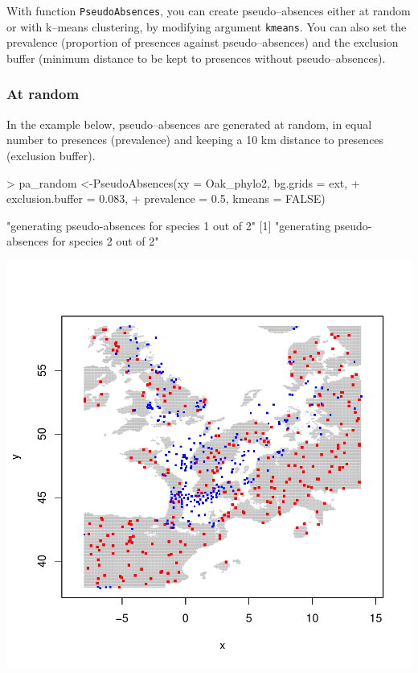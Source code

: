 \documentclass[10pt,a4paper]{article}
\begin{document}
With function \texttt{PseudoAbsences}, you can create pseudo--absences either at random or with k--means clustering, by modifying argument \texttt{kmeans}. You can also set the prevalence (proportion of presences against pseudo--absences) and the exclusion buffer (minimum distance to be kept to presences without pseudo--absences).

\subsubsection{At random}

In the example below, pseudo--absences are generated at random, in equal number to presences (prevalence) and keeping a 10 km distance to presences (exclusion buffer).



\begin{Schunk}
\begin{Sinput}
> pa_random <-PseudoAbsences(xy = Oak_phylo2, bg.grids = ext, 
+                            exclusion.buffer = 0.083, 
+                            prevalence = 0.5, kmeans = FALSE)
\end{Sinput}
\begin{Soutput}
[1] "generating pseudo-absences for species 1 out of 2"
[1] "generating pseudo-absences for species 2 out of 2"
\end{Soutput}
\end{Schunk}
\includegraphics{mopa-mopa9}
\end{document}
